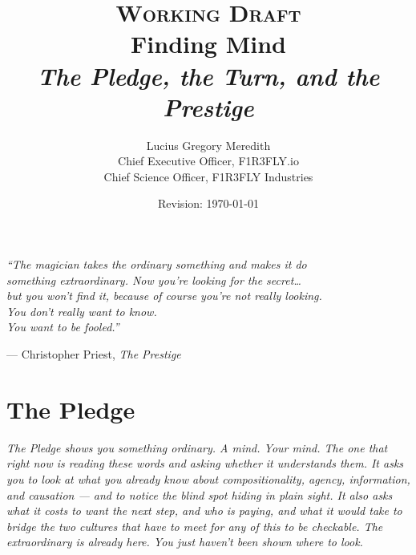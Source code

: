 \documentclass[12pt,openright,twoside]{book}
\title{%
  \vspace{-0.8in}
  {\large\scshape Working Draft}\\[0.6em]
  {\Huge\bfseries Finding Mind}\\[0.5em]
  {\large\itshape The Pledge, the Turn, and the Prestige}
}
\author{%
  Lucius Gregory Meredith\\[0.3em]
  {\small Chief Executive Officer, F1R3FLY.io}\\
  {\small Chief Science Officer, F1R3FLY Industries}
}
\date{Revision: \today}
\theoremstyle{remark}
\theoremstyle{plain}
\theoremstyle{remark}
\theoremstyle{plain}
\theoremstyle{plain}
\begin{document}

\maketitle
\thispagestyle{empty}

\newpage
\thispagestyle{empty}
\vspace*{\fill}
\begin{center}
  \large\itshape
  ``The magician takes the ordinary something and makes it do\\
  something extraordinary. Now you're looking for the secret\ldots{}\\
  but you won't find it, because of course you're not really looking.\\
  You don't really want to know.\\
  You want to be fooled.''
  \medskip

  \normalsize\upshape --- Christopher Priest, \textit{The Prestige}
\end{center}
\vspace*{\fill}
\newpage

\tableofcontents
\newpage

\part{The Pledge}

\vspace{1em}
\begin{mdframed}[backgroundcolor=remarkgray, linecolor=gray!60,
                 linewidth=1pt, topline=false, rightline=false,
                 bottomline=false]
\small\itshape
The Pledge shows you something ordinary.
A mind. Your mind.
The one that right now is reading these words and asking whether it
understands them.
It asks you to look at what you already know about compositionality,
agency, information, and causation --- and to notice the blind spot
hiding in plain sight.
It also asks what it costs to want the next step, and who is paying,
and what it would take to bridge the two cultures that have to meet
for any of this to be checkable.
The extraordinary is already here.
You just haven't been shown where to look.
\end{mdframed}
\end{document}

